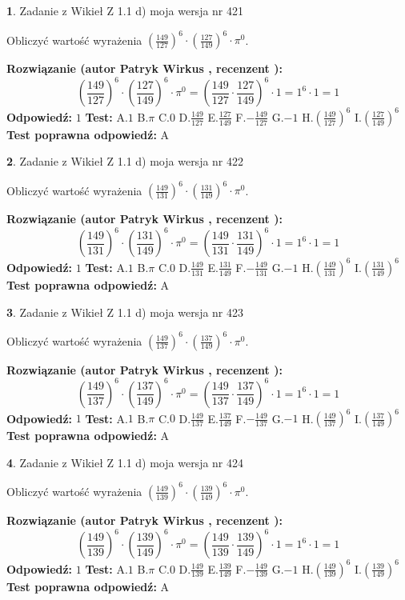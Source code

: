 \documentclass[12pt, a4paper]{article}
\theoremstyle{definition} %
\newtheorem{zad}{}
\newcommand{\zadStart}[1]{\begin{zad}#1\newline}
\newcommand{\zadStop}{\end{zad}}
\newcommand{\rozwStart}[2]{\noindent \textbf{Rozwiązanie (autor #1 , recenzent #2): }\newline}
\newcommand{\rozwStop}{\newline}
\newcommand{\odpStart}{\noindent \textbf{Odpowiedź:}\newline}
\newcommand{\odpStop}{\newline}
\newcommand{\testStart}{\noindent \textbf{Test:}\newline}
\newcommand{\testStop}{\newline}
\newcommand{\kluczStart}{\noindent \textbf{Test poprawna odpowiedź:}\newline}
\newcommand{\kluczStop}{\newline}
\begin{document}
\zadStart{Zadanie z Wikieł Z 1.1 d) moja wersja nr 421}

Obliczyć wartość wyrażenia $(\frac{149}{127})^{6} \cdot (\frac{127}{149})^{6} \cdot \pi^{0}$.
\zadStop
\rozwStart{Patryk Wirkus}{}
$$(\frac{149}{127})^{6} \cdot (\frac{127}{149})^{6} \cdot \pi^{0} = (\frac{149}{127} \cdot \frac{127}{149})^{6} \cdot 1 = 1^{6} \cdot 1 = 1$$
\rozwStop
\odpStart
$1$
\odpStop
\testStart
A.$1$ B.$\pi$ C.$0$ D.$\frac{149}{127}$ E.$\frac{127}{149}$
F.$-\frac{149}{127}$ G.$-1$
H.$(\frac{149}{127})^{6}$
I.$(\frac{127}{149})^{6}$
\testStop
\kluczStart
A
\kluczStop



\zadStart{Zadanie z Wikieł Z 1.1 d) moja wersja nr 422}

Obliczyć wartość wyrażenia $(\frac{149}{131})^{6} \cdot (\frac{131}{149})^{6} \cdot \pi^{0}$.
\zadStop
\rozwStart{Patryk Wirkus}{}
$$(\frac{149}{131})^{6} \cdot (\frac{131}{149})^{6} \cdot \pi^{0} = (\frac{149}{131} \cdot \frac{131}{149})^{6} \cdot 1 = 1^{6} \cdot 1 = 1$$
\rozwStop
\odpStart
$1$
\odpStop
\testStart
A.$1$ B.$\pi$ C.$0$ D.$\frac{149}{131}$ E.$\frac{131}{149}$
F.$-\frac{149}{131}$ G.$-1$
H.$(\frac{149}{131})^{6}$
I.$(\frac{131}{149})^{6}$
\testStop
\kluczStart
A
\kluczStop



\zadStart{Zadanie z Wikieł Z 1.1 d) moja wersja nr 423}

Obliczyć wartość wyrażenia $(\frac{149}{137})^{6} \cdot (\frac{137}{149})^{6} \cdot \pi^{0}$.
\zadStop
\rozwStart{Patryk Wirkus}{}
$$(\frac{149}{137})^{6} \cdot (\frac{137}{149})^{6} \cdot \pi^{0} = (\frac{149}{137} \cdot \frac{137}{149})^{6} \cdot 1 = 1^{6} \cdot 1 = 1$$
\rozwStop
\odpStart
$1$
\odpStop
\testStart
A.$1$ B.$\pi$ C.$0$ D.$\frac{149}{137}$ E.$\frac{137}{149}$
F.$-\frac{149}{137}$ G.$-1$
H.$(\frac{149}{137})^{6}$
I.$(\frac{137}{149})^{6}$
\testStop
\kluczStart
A
\kluczStop



\zadStart{Zadanie z Wikieł Z 1.1 d) moja wersja nr 424}

Obliczyć wartość wyrażenia $(\frac{149}{139})^{6} \cdot (\frac{139}{149})^{6} \cdot \pi^{0}$.
\zadStop
\rozwStart{Patryk Wirkus}{}
$$(\frac{149}{139})^{6} \cdot (\frac{139}{149})^{6} \cdot \pi^{0} = (\frac{149}{139} \cdot \frac{139}{149})^{6} \cdot 1 = 1^{6} \cdot 1 = 1$$
\rozwStop
\odpStart
$1$
\odpStop
\testStart
A.$1$ B.$\pi$ C.$0$ D.$\frac{149}{139}$ E.$\frac{139}{149}$
F.$-\frac{149}{139}$ G.$-1$
H.$(\frac{149}{139})^{6}$
I.$(\frac{139}{149})^{6}$
\testStop
\kluczStart
A
\kluczStop
\end{document}
